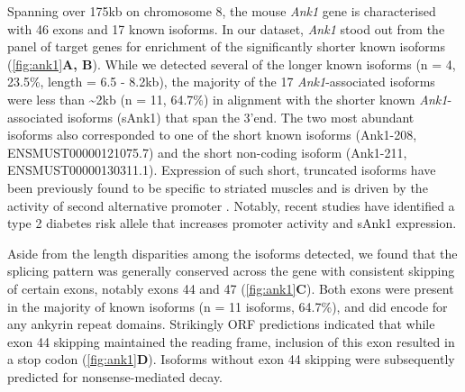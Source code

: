 Spanning over 175kb on chromosome 8, the mouse \textit{Ank1} gene is characterised with 46 exons and 17 known isoforms. In our dataset, \textit{Ank1} stood out from the panel of target genes for enrichment of the significantly shorter known isoforms (\cref{fig:ank1}\textbf{A, B}). While we detected several of the longer known isoforms (n = 4, 23.5\%, length = 6.5 - 8.2kb), the majority of the 17 \textit{Ank1}-associated isoforms were less than \textasciitilde 2kb (n = 11, 64.7\%) in alignment with the shorter known \textit{Ank1}-associated isoforms (sAnk1) that span the 3'end. The two most abundant isoforms also corresponded to one of the short known isoforms (Ank1-208, ENSMUST00000121075.7) and the short non-coding isoform (Ank1-211, ENSMUST00000130311.1). Expression of such short, truncated isoforms have been previously found to be specific to striated muscles and is driven by the activity of second alternative promoter \cite{Gallagher1998}. Notably, recent studies have identified a type 2 diabetes risk allele that increases promoter activity and sAnk1 expression\cite{Yan2016}.  %

Aside from the length disparities among the isoforms detected, we found that the splicing pattern was generally conserved across the gene with consistent skipping of certain exons, notably exons 44 and 47 (\cref{fig:ank1}\textbf{C}). Both exons were present in the majority of known isoforms (n = 11 isoforms, 64.7\%), and did encode for any ankyrin repeat domains. Strikingly ORF predictions indicated that while exon 44 skipping maintained the reading frame, inclusion of this exon resulted in a stop codon (\cref{fig:ank1}\textbf{D}). Isoforms without exon 44 skipping were subsequently predicted for nonsense-mediated decay. 

